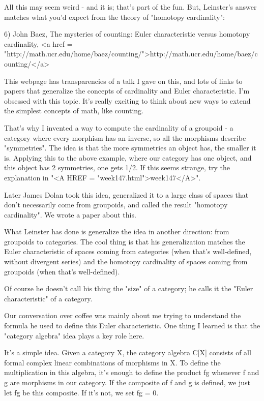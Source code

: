 All this may seem weird - and it is; that's part of the fun.  But,
Leinster's answer matches what you'd expect from the theory of
"homotopy cardinality":

6) John Baez, The mysteries of counting: Euler characteristic versus
homotopy cardinality, <a href = "http://math.ucr.edu/home/baez/counting/">http://math.ucr.edu/home/baez/counting/</a>

This webpage has transparencies of a talk I gave on this, and lots of 
links to papers that generalize the concepts of cardinality and Euler
characteristic.  I'm obsessed with this topic.  It's really exciting 
to think about new ways to extend the simplest concepts of math, like 
counting.  

That's why I invented a way to compute the cardinality of a groupoid -
a category where every morphism has an inverse, so all the morphisms
describe "symmetries".  The idea is that the more symmetries
an object has, the smaller it is.  Applying this to the above example,
where our category has one object, and this object has 2 symmetries,
one gets 1/2.  If this seems strange, try the explanation in "<A
HREF = "week147.html">week147</A>".

Later James Dolan took this idea, generalized it to a large class 
of spaces that don't necessarily come from groupoids, and called the
result "homotopy cardinality".  We wrote a paper about this.

What Leinster has done is generalize the idea in another direction: from 
groupoids to categories.  The cool thing is that his generalization 
matches the Euler characteristic of spaces coming from categories 
(when that's well-defined, without divergent series) and the homotopy 
cardinality of spaces coming from groupoids (when that's well-defined).

Of course he doesn't call his thing the "size" of a
category; he calls it the "Euler characteristic" of a
category.

Our conversation over coffee was mainly about me trying to understand
the formula he used to define this Euler characteristic.  One thing I
learned is that the "category algebra" idea plays a key role
here.

It's a simple idea.  Given a category X, the category algebra C[X]
consists of all formal complex linear combinations of morphisms in X.
To define the multiplication in this algebra, it's enough to define
the product fg whenever f and g are morphisms in our category.  If 
the composite of f and g is defined, we just let fg be this composite.
If it's not, we set fg = 0.  

